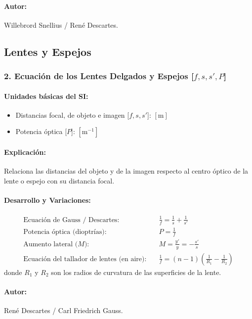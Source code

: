 \documentclass[12pt,a4paper]{article}
\begin{document}
\paragraph*{Autor:} Willebrord Snellius / René Descartes.

\subsection{Lentes y Espejos}

\subsubsection*{2. Ecuación de los Lentes Delgados y Espejos [$f, s, s', P$]}
\paragraph*{Unidades básicas del SI:}
\begin{itemize}
    \item Distancias focal, de objeto e imagen [$f, s, s'$]: $[\text{m}]$
    \item Potencia óptica [$P$]: $[\text{m}^{-1}]$
\end{itemize}
\paragraph*{Explicación:} Relaciona las distancias del objeto y de la imagen respecto al centro óptico de la lente o espejo con su distancia focal.
\paragraph*{Desarrollo y Variaciones:}
\begin{align*}
\text{Ecuación de Gauss / Descartes:} \quad & \frac{1}{f} = \frac{1}{s} + \frac{1}{s'} \\
\text{Potencia óptica (dioptrías):} \quad & P = \frac{1}{f} \\
\text{Aumento lateral ($M$):} \quad & M = \frac{y'}{y} = -\frac{s'}{s} \\
\text{Ecuación del tallador de lentes (en aire):} \quad & \frac{1}{f} = (n - 1) \left( \frac{1}{R_1} - \frac{1}{R_2} \right)
\end{align*}
donde $R_1$ y $R_2$ son los radios de curvatura de las superficies de la lente.
\paragraph*{Autor:} René Descartes / Carl Friedrich Gauss.
\end{document}
